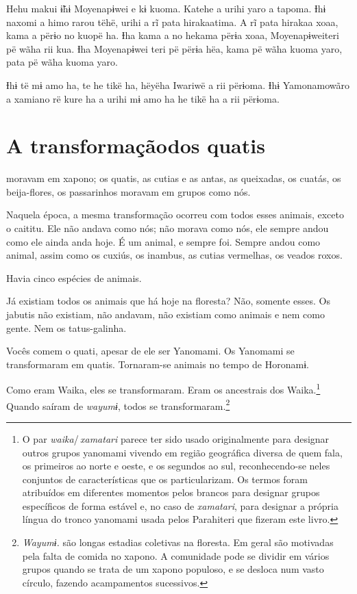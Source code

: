 Hehu makui ɨ̃hɨ Moyenapɨwei e kɨ kuoma. Katehe a urihi yaro a tapoma. Ɨhɨ
naxomi a himo rarou tëhë, urihi a rĩ pata hirakaatima. A rĩ pata hirakaa
xoaa, kama a përɨo no kuopë ha. Ɨha kama a no hekama përɨa xoaa,
Moyenapɨweiteri pë wãha rii kua. Ɨha Moyenapɨwei teri pë përɨa hëa, kama
pë wãha kuoma yaro, pata pë wãha kuoma yaro. 

Ɨhɨ të mɨ amo ha, te he tikë ha, hëyëha Iwariwë a rii përɨoma. Ɨhɨ
Yamonamowãro a xamiano rë kure ha a urihi mɨ amo ha he tikë ha a rii
përɨoma. 

 
\chapter[A transformação dos quatis]{A transformação\break dos quatis}

 moravam em xapono; os quatis, as cutias e as antas, as
queixadas, os cuatás, os beija-flores, os passarinhos moravam em grupos
como nós.

Naquela época, a mesma transformação ocorreu com todos esses animais,
exceto o caititu. Ele não andava como nós; não morava como nós, ele
sempre andou como ele ainda anda hoje. É um animal, e sempre foi. Sempre
andou como animal, assim como os cuxiús, os inambus, as cutias
vermelhas, os veados roxos.

Havia cinco espécies de animais. 

Já existiam todos os animais que há hoje na floresta? Não, somente
esses. Os jabutis não existiam, não andavam, não existiam como animais e
nem como gente. Nem os tatus-galinha. 

Vocês comem o quati, apesar de ele ser Yanomami. Os Yanomami se
transformaram em quatis. Tornaram-se animais no tempo de Horonamɨ. 

Como eram Waika, eles se transformaram. Eram os ancestrais dos Waika.\footnote{O par \textit{waika}/\,\textit{xamatari} parece ter sido usado originalmente para designar outros grupos yanomami vivendo em região geográfica diversa de quem fala, os primeiros ao norte e oeste, e os segundos ao sul, reconhecendo-se neles conjuntos de características que os particularizam. Os termos foram atribuídos em diferentes momentos pelos brancos para designar grupos específicos de forma estável e, no caso de \textit{xamatari}, para designar a própria língua do tronco yanomami usada pelos Parahiteri que fizeram este livro.} Quando saíram de \textit{wayumɨ}, todos se transformaram.\footnote{\textit{Wayumɨ.} são longas estadias coletivas na floresta. Em geral são motivadas pela falta de comida no xapono. A comunidade pode se dividir em vários grupos quando se trata de um xapono populoso, e se desloca num vasto círculo, fazendo acampamentos sucessivos.} 


